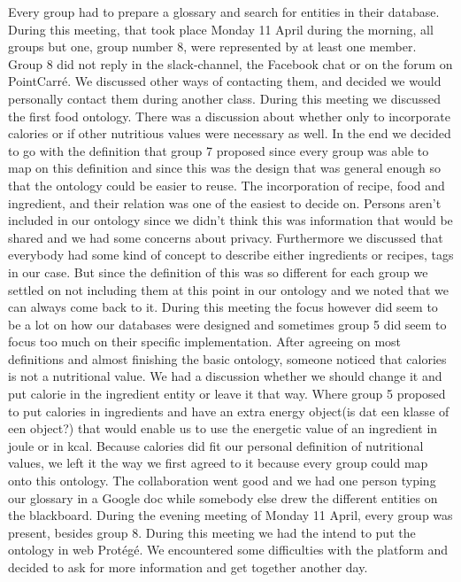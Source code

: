 Every group had to prepare a glossary and search for entities in their database. During this meeting, that took place Monday 11 April during the morning, all groups but one, group number 8, were represented by at least one member. Group 8 did not reply in the slack-channel, the Facebook chat or on the forum on PointCarré. We discussed other ways of contacting them, and decided we would personally contact them during another class. During this meeting we discussed the first food ontology. There was a discussion about whether only to incorporate calories or if other nutritious values were necessary as well. In the end we decided to go with the definition that group 7 proposed since every group was able to map on this definition and since this was the design that was general enough so that the ontology could be easier to reuse. The incorporation of recipe, food and ingredient, and their relation was one of the easiest to decide on. Persons aren't included in our ontology since we didn't think this was information that would be shared and we had some concerns about privacy. Furthermore we discussed that everybody had some kind of concept to describe either ingredients or recipes, tags in our case. But since the definition of this was so different for each group we settled on not including them at this point in our ontology and we noted that we can always come back to it. During this meeting the focus however did seem to be a lot on how our databases were designed and sometimes group 5 did seem to focus too much on their specific implementation. After agreeing on most definitions and almost finishing the basic ontology, someone noticed that calories is not a nutritional value. We had a discussion whether we should change it and put calorie in the ingredient entity or leave it that way. Where group 5 proposed to put calories in ingredients and have an extra energy object(is dat een klasse of een object?) that would enable us to use the energetic value of an ingredient in joule or in kcal. Because calories did fit our personal definition of nutritional values, we left it the way we first agreed to it because every group could map onto this ontology. The collaboration went good and we had one person typing our glossary in a Google doc while somebody else drew the different entities on the blackboard. 
\newline
\newline
\noindent
During the evening meeting of Monday 11 April, every group was present, besides group 8. During this meeting we had the intend to put the ontology in web Protégé. We encountered some difficulties with the platform and decided to ask for more information and get together another day. 
